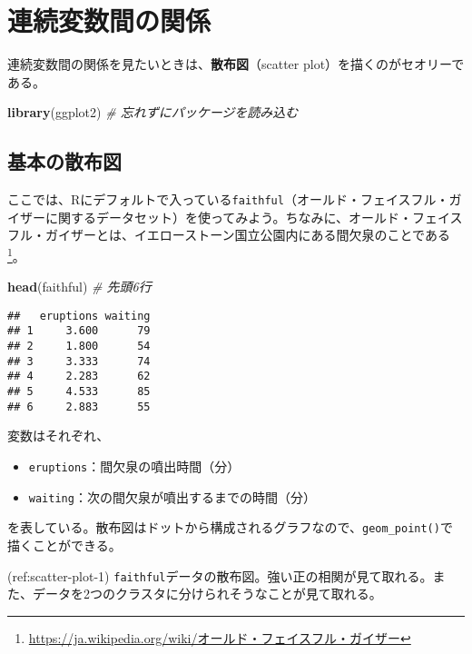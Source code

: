 \documentclass[]{book}
\newenvironment{Shaded}{\begin{snugshade}}{\end{snugshade}}
\newcommand{\KeywordTok}[1]{\textcolor[rgb]{0.13,0.29,0.53}{\textbf{#1}}}
\newcommand{\CommentTok}[1]{\textcolor[rgb]{0.56,0.35,0.01}{\textit{#1}}}
\newcommand{\NormalTok}[1]{#1}
\let\rmarkdownfootnote\footnote%
\def\footnote{\protect\rmarkdownfootnote}
\begin{document}
\chapter{連続変数間の関係}\label{association}

連続変数間の関係を見たいときは、\textbf{散布図}（scatter
plot）を描くのがセオリーである。

\begin{Shaded}
\begin{Highlighting}[]
\KeywordTok{library}\NormalTok{(ggplot2) }\CommentTok{# 忘れずにパッケージを読み込む}
\end{Highlighting}
\end{Shaded}

\section{基本の散布図}

ここでは、Rにデフォルトで入っている\texttt{faithful}（オールド・フェイスフル・ガイザーに関するデータセット）を使ってみよう。ちなみに、オールド・フェイスフル・ガイザーとは、イエローストーン国立公園内にある間欠泉のことである\footnote{\url{https://ja.wikipedia.org/wiki/オールド・フェイスフル・ガイザー}}。

\begin{Shaded}
\begin{Highlighting}[]
\KeywordTok{head}\NormalTok{(faithful) }\CommentTok{# 先頭6行}
\end{Highlighting}
\end{Shaded}

\begin{verbatim}
##   eruptions waiting
## 1     3.600      79
## 2     1.800      54
## 3     3.333      74
## 4     2.283      62
## 5     4.533      85
## 6     2.883      55
\end{verbatim}

変数はそれぞれ、

\begin{itemize}
\item
  \texttt{eruptions}：間欠泉の噴出時間（分）
\item
  \texttt{waiting}：次の間欠泉が噴出するまでの時間（分）
\end{itemize}

を表している。散布図はドットから構成されるグラフなので、\texttt{geom\_point()}で描くことができる。

(ref:scatter-plot-1)
\texttt{faithful}データの散布図。強い正の相関が見て取れる。また、データを2つのクラスタに分けられそうなことが見て取れる。
\end{document}
